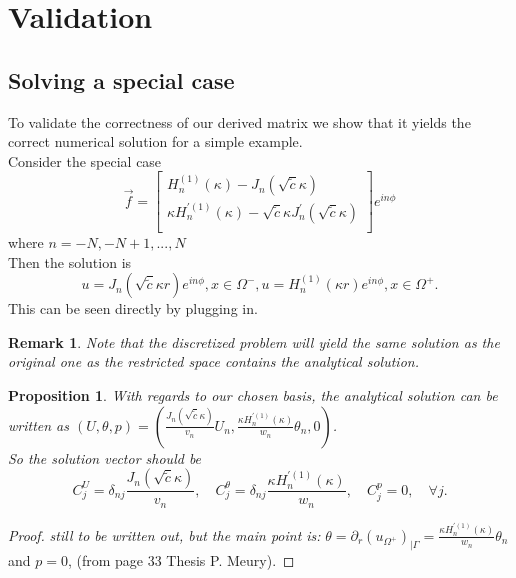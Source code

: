 \documentclass[10pt,journal,compsoc, onecolumn]{IEEEtran}
\newtheorem{proposition}[theorem]{Proposition}
\newtheorem{remark}[theorem]{Remark}
\begin{document}

\section{Validation}


\subsection{Solving a special case}
To validate the correctness of our derived matrix we show that it yields the correct numerical solution for a simple example. \\
Consider the special case
$$
\vec{f} = 
\begin{bmatrix}
    H_n^{(1)}(\kappa) -  J_n(\sqrt{\tilde c} \kappa ) \\
    \kappa H_n^{\prime (1)}(\kappa) - \sqrt{\tilde c} \kappa J_n^{\prime}(\sqrt{\tilde c} \kappa )\\
\end{bmatrix} e^{i n \phi}
$$
where $n =-N, -N+1, ..., N$ \\
Then the solution is 
$$
u = J_n(\sqrt{\tilde c} \kappa r) e^{i n \phi}, x \in \Omega^-, u = H_n^{(1)}(\kappa r)e^{i n \phi}, x \in \Omega^+.
$$
This can be seen directly by plugging in.\\
\begin{remark}
Note that the discretized problem will yield the same solution as the original one 
    as the restricted space contains the analytical solution. 
\end{remark}
\begin{proposition}
    \label{prop:anasol}
    With regards to our chosen basis, the analytical solution can be written as 
    $(U, \theta, p) =
     \left(\frac{J_n(\sqrt{\tilde c}\kappa)}{v_n} U_n, \frac{\kappa H_n^{\prime(1)}(\kappa)}{w_n} \theta_n, 0\right)$. \\
    So the solution vector should be
    $$
        C_j^U = \delta_{nj}  \frac{J_n(\sqrt{\tilde c}\kappa)}{v_n}, \quad
        C_j^\theta = \delta_{nj} \frac{\kappa H_n^{\prime(1)}(\kappa)}{w_n}, \quad 
        C_j^p = 0, \quad
        \forall j.
    $$
\end{proposition}
\begin{proof}
    \textit{still to be written out, but the main point is:} 
    $\theta = \partial_r(u_{\Omega^+})_{|\Gamma} = \frac{\kappa H_n^{\prime(1)}(\kappa)}{w_n}  \theta_n $ and $p = 0$, (from page 33 Thesis P. Meury).
\end{proof}
\end{document}
